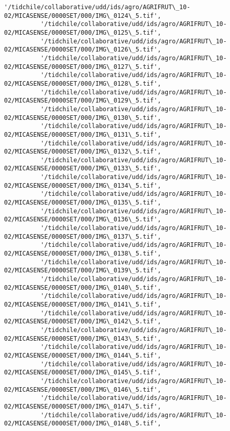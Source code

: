 \documentclass[11pt]{article}
\begin{document}
\begin{Verbatim}[commandchars=\\\{\}]
          '/tidchile/collaborative/udd/ids/agro/AGRIFRUT\_10-02/MICASENSE/0000SET/000/IMG\_0124\_5.tif',
          '/tidchile/collaborative/udd/ids/agro/AGRIFRUT\_10-02/MICASENSE/0000SET/000/IMG\_0125\_5.tif',
          '/tidchile/collaborative/udd/ids/agro/AGRIFRUT\_10-02/MICASENSE/0000SET/000/IMG\_0126\_5.tif',
          '/tidchile/collaborative/udd/ids/agro/AGRIFRUT\_10-02/MICASENSE/0000SET/000/IMG\_0127\_5.tif',
          '/tidchile/collaborative/udd/ids/agro/AGRIFRUT\_10-02/MICASENSE/0000SET/000/IMG\_0128\_5.tif',
          '/tidchile/collaborative/udd/ids/agro/AGRIFRUT\_10-02/MICASENSE/0000SET/000/IMG\_0129\_5.tif',
          '/tidchile/collaborative/udd/ids/agro/AGRIFRUT\_10-02/MICASENSE/0000SET/000/IMG\_0130\_5.tif',
          '/tidchile/collaborative/udd/ids/agro/AGRIFRUT\_10-02/MICASENSE/0000SET/000/IMG\_0131\_5.tif',
          '/tidchile/collaborative/udd/ids/agro/AGRIFRUT\_10-02/MICASENSE/0000SET/000/IMG\_0132\_5.tif',
          '/tidchile/collaborative/udd/ids/agro/AGRIFRUT\_10-02/MICASENSE/0000SET/000/IMG\_0133\_5.tif',
          '/tidchile/collaborative/udd/ids/agro/AGRIFRUT\_10-02/MICASENSE/0000SET/000/IMG\_0134\_5.tif',
          '/tidchile/collaborative/udd/ids/agro/AGRIFRUT\_10-02/MICASENSE/0000SET/000/IMG\_0135\_5.tif',
          '/tidchile/collaborative/udd/ids/agro/AGRIFRUT\_10-02/MICASENSE/0000SET/000/IMG\_0136\_5.tif',
          '/tidchile/collaborative/udd/ids/agro/AGRIFRUT\_10-02/MICASENSE/0000SET/000/IMG\_0137\_5.tif',
          '/tidchile/collaborative/udd/ids/agro/AGRIFRUT\_10-02/MICASENSE/0000SET/000/IMG\_0138\_5.tif',
          '/tidchile/collaborative/udd/ids/agro/AGRIFRUT\_10-02/MICASENSE/0000SET/000/IMG\_0139\_5.tif',
          '/tidchile/collaborative/udd/ids/agro/AGRIFRUT\_10-02/MICASENSE/0000SET/000/IMG\_0140\_5.tif',
          '/tidchile/collaborative/udd/ids/agro/AGRIFRUT\_10-02/MICASENSE/0000SET/000/IMG\_0141\_5.tif',
          '/tidchile/collaborative/udd/ids/agro/AGRIFRUT\_10-02/MICASENSE/0000SET/000/IMG\_0142\_5.tif',
          '/tidchile/collaborative/udd/ids/agro/AGRIFRUT\_10-02/MICASENSE/0000SET/000/IMG\_0143\_5.tif',
          '/tidchile/collaborative/udd/ids/agro/AGRIFRUT\_10-02/MICASENSE/0000SET/000/IMG\_0144\_5.tif',
          '/tidchile/collaborative/udd/ids/agro/AGRIFRUT\_10-02/MICASENSE/0000SET/000/IMG\_0145\_5.tif',
          '/tidchile/collaborative/udd/ids/agro/AGRIFRUT\_10-02/MICASENSE/0000SET/000/IMG\_0146\_5.tif',
          '/tidchile/collaborative/udd/ids/agro/AGRIFRUT\_10-02/MICASENSE/0000SET/000/IMG\_0147\_5.tif',
          '/tidchile/collaborative/udd/ids/agro/AGRIFRUT\_10-02/MICASENSE/0000SET/000/IMG\_0148\_5.tif',

\end{Verbatim}
\end{document}
